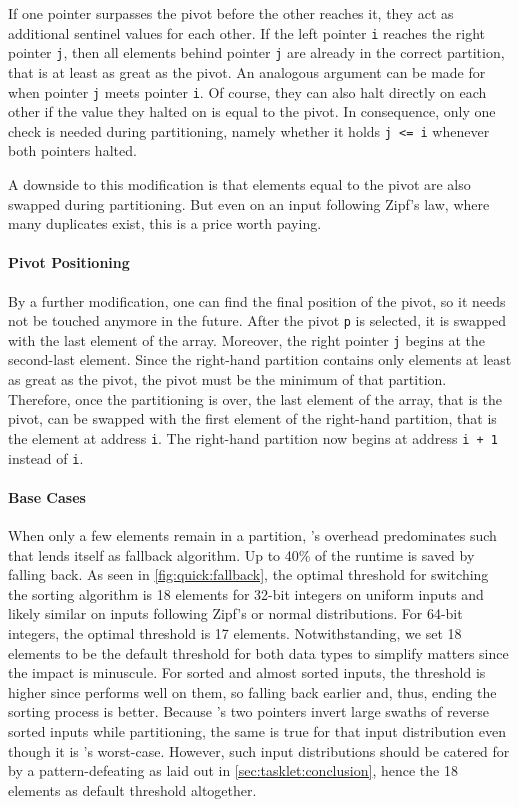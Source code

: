 If one pointer surpasses the pivot before the other reaches it, they act as additional sentinel values for each other.
If the left pointer \lstinline|i| reaches the right pointer \lstinline|j|, then all elements behind pointer \lstinline|j| are already in the correct partition, that is at least as great as the pivot.
An analogous argument can be made for when pointer \lstinline|j| meets pointer \lstinline|i|.
Of course, they can also halt directly on each other if the value they halted on is equal to the pivot.
In consequence, only one check is needed during partitioning, namely whether it holds \lstinline|j <= i| whenever both pointers halted.

A downside to this modification is that elements equal to the pivot are also swapped during partitioning.
But even on an input following Zipf's law, where many duplicates exist, this is a price worth paying.


\paragraph{Pivot Positioning}
By a further modification, one can find the final position of the pivot, so it needs not be touched anymore in the future.
After the pivot \lstinline|p| is selected, it is swapped with the last element of the array.
Moreover, the right pointer \lstinline|j| begins at the second-last element.
Since the right-hand partition contains only elements at least as great as the pivot, the pivot must be the minimum of that partition.
Therefore, once the partitioning is over, the last element of the array, that is the pivot, can be swapped with the first element of the right-hand partition, that is the element at address \lstinline|i|.
The right-hand partition now begins at address \lstinline|i + 1| instead of \lstinline|i|.


\paragraph{Base Cases}
When only a few elements remain in a partition, \QS{}'s overhead predominates such that \IS{} lends itself as fallback algorithm.
Up to 40\% of the runtime is saved by falling back.
As seen in \cref{fig:quick:fallback}, the optimal threshold for switching the sorting algorithm is 18 elements for 32-bit integers on uniform inputs and likely similar on inputs following Zipf's or normal distributions.
For 64-bit integers, the optimal threshold is 17 elements.
Notwithstanding, we set 18 elements to be the default threshold for both data types to simplify matters since the impact is minuscule.
For sorted and almost sorted inputs, the threshold is higher since \IS{} performs well on them, so falling back earlier and, thus, ending the sorting process is better.
Because \QS{}'s two pointers invert large swaths of reverse sorted inputs while partitioning, the same is true for that input distribution even though it is \IS{}'s worst-case.
However, such input distributions should be catered for by a pattern-defeating \QS{} as laid out in \cref{sec:tasklet:conclusion}, hence the 18 elements as default threshold altogether.

